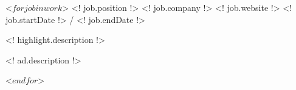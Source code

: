 \begin{cventries}
 <$ for job in work $>
  \cventry
    {<! job.position !>}
    {<! job.company !>}
    {<! job.website !>}
    {<! job.startDate !> / <! job.endDate !>}
    {
          \begin{cvitems}
                \item{<! highlight.description !>}
                    \begin{cvitemssub}
                        \item{<! ad.description !>}
                    \end{cvitemssub}
          \end{cvitems}
    }
 <$ endfor $>
\end{cventries}
